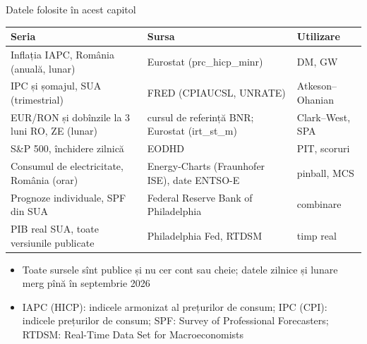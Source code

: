 \begin{frame}{Datele folosite în acest capitol}
\itemsize{\footnotesize}
\begin{center}
\scriptsize
\begin{tabular}{>{\raggedright\arraybackslash}p{4.2cm}>{\raggedright\arraybackslash}p{4.6cm}>{\raggedright\arraybackslash}p{2.6cm}}
\toprule
\textbf{Seria} & \textbf{Sursa} & \textbf{Utilizare} \\
\midrule
Inflația IAPC, România (anuală, lunar) & Eurostat (prc\_hicp\_minr) & DM, GW \\
IPC și șomajul, SUA (trimestrial) & FRED (CPIAUCSL, UNRATE) & Atkeson--Ohanian \\
EUR/RON și dobînzile la 3 luni RO, ZE (lunar) & cursul de referință BNR; Eurostat (irt\_st\_m) & Clark--West, SPA \\
S\&P 500, închidere zilnică & EODHD & PIT, scoruri \\
Consumul de electricitate, România (orar) & Energy-Charts (Fraunhofer ISE), date ENTSO-E & pinball, MCS \\
Prognoze individuale, SPF din SUA & Federal Reserve Bank of Philadelphia & combinare \\
PIB real SUA, toate versiunile publicate & Philadelphia Fed, RTDSM & timp real \\
\bottomrule
\end{tabular}
\end{center}
\begin{itemize}
    \item Toate sursele sînt publice și nu cer cont sau cheie; datele zilnice și lunare merg pînă în septembrie 2026
    \item IAPC (HICP): indicele armonizat al prețurilor de consum; IPC (CPI): indicele prețurilor de consum; SPF: Survey of Professional Forecasters; RTDSM: Real-Time Data Set for Macroeconomists
\end{itemize}
\end{frame}

